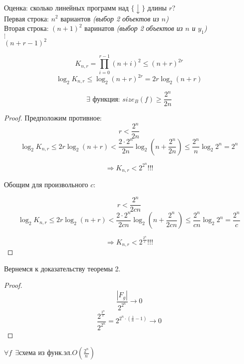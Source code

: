 Оценка: сколько линейных программ над $\{\downarrow\}$ длины $r$? \\
Первая строка: $n^2$ вариантов \textit{(выбор 2 объектов из $n$)} \\
Вторая строка: $(n+1)^2$ варинатов \textit{(выбор 2 объектов из $n$ и $y_1$)} \\
$\vdots$ \\
$(n + r - 1)^{2}$

$$K_{n,r}=\prod\limits_{i=0}^{r-1}(n+i)^2\leq(n+r)^{2r}$$
$$\log_2 K_{n,r}\leq \log_2 (n+r)^{2r}=2r\log_2 (n+r)$$

\begin{lemma}
$$\exists \text{ функция: } size_B(f)\geq\frac{2^n}{2n}$$
\end{lemma}
\begin{proof}
Предположим противное:
$$r<\frac{2^n}{2n}$$
$$\log_2 K_{n,r}\leq 2r\log_2(n+r)<\frac{2\cdot 2^n}{2n}\log_2(n+\frac{2^n}{2n})\leq \frac{2^n}{n}\log_2 2^n=2^n$$

$$\Rightarrow K_{n,r}<2^{2^n} !!!$$

Обощим для произвольного $c$:

$$r<\frac{2^n}{2cn}$$
$$\log_2 K_{n,r}\leq 2r\log_2(n+r)<\frac{2\cdot 2^n}{2cn}\log_2(n+\frac{2^n}{2cn})\leq \frac{2^n}{cn}\log_2 2^n=\frac{2^n}{c}$$

$$\Rightarrow K_{n,r}<2^{\frac{2^n}{c}} !!!$$
\end{proof}

Вернемся к доказательству теоремы 2.

\begin{proof}

$$\frac{|F_g|}{2^{2^n}}\to 0$$
$$\frac{2^{\frac{2^n}{c}}}{2^{2^n}}=2^{2^n\cdot (\frac{1}{n}-1)}\to 0$$
\end{proof}

\begin{theorem}
$\forall f \ \ \exists \text{схема из функ.эл.} O(\frac{2^n}{n})$
\end{theorem}

